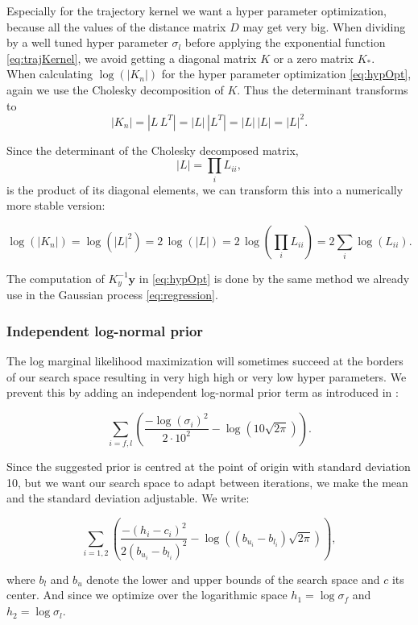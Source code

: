 Especially for the trajectory kernel we want a hyper parameter optimization, because all the values of the distance matrix $D$ may get very big. When dividing by a well tuned hyper parameter $\sigma_l$ before applying the exponential function \eqref{eq:trajKernel}, we avoid getting a diagonal matrix $K$ or a zero matrix $K_*$.\\

When calculating $\log(|K_n|)$ for the hyper parameter optimization \eqref{eq:hypOpt}, again we use the Cholesky decomposition of $K$. Thus the determinant transforms to
$$|K_n|=|L\,L^{T}|=|L|\,|L^{T}|=|L|\,|L|=|L|^{2}.$$

Since the determinant of the Cholesky decomposed matrix,
$$|L| = \textstyle\prod_{i} L_{ii},$$
is the product of its diagonal elements, we can transform this into a numerically more stable version:

$$\log(|K_n|) = \log(|L|^{2}) = 2\,\log(|L|) = 2\,\log(\textstyle\prod_{i} L_{ii}) = 2\textstyle\sum_{i} \log(L_{ii}).$$

The computation of $K_y^{-1}\mathbf{y}$ in \eqref{eq:hypOpt} is done by the same method we already use in the Gaussian process \eqref{eq:regression}.

\subsubsection{Independent log-normal prior}
The log marginal likelihood maximization will sometimes succeed at the borders of our search space resulting in very high high or very low hyper parameters. We prevent this by adding an independent log-normal prior term as introduced in \cite{lizotte2008practical}:

$$\sum_{i=f,l}\left(\frac{-\log(\sigma_i)^2}{2\cdot 10^2} - \log\left(10\sqrt{2\pi}\right) \right).$$

Since the suggested prior is centred at the point of origin with standard deviation 10, but we want our search space to adapt between iterations, we make the mean and the standard deviation adjustable. We write:

$$\sum_{i=1,2}\left(\frac{-(h_i-c_i)^2}{2(b_{u_i}-b_{l_i})^2} - \log\left((b_{u_i}-b_{l_i})\sqrt{2\pi}\right) \right),$$

where $b_l$ and $b_u$ denote the lower and upper bounds of the search space and $c$ its center. And since we optimize over the logarithmic space $h_1 = \log\sigma_f$ and $h_2 = \log\sigma_l$.
